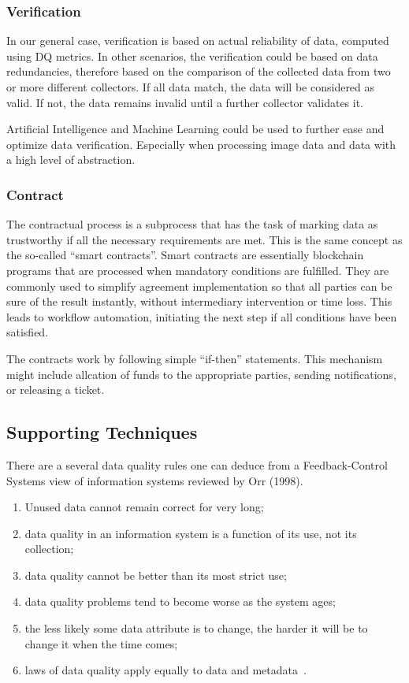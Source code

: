 \subsubsection{Verification}

In our general case, verification is based on actual reliability of data, computed using DQ metrics.
In other scenarios, the verification could be based on data redundancies, therefore based on the comparison of the collected data from two or more different collectors.
If all data match, the data will be considered as valid.
If not, the data remains invalid until a further collector validates it.

Artificial Intelligence and Machine Learning could be used to further ease and optimize data verification.
Especially when processing image data and data with a high level of abstraction.

\subsubsection{Contract}

The contractual process is a subprocess that has the task of marking data as trustworthy if all the necessary requirements are met.
This is the same concept as the so-called \enquote{smart contracts}.
Smart contracts are essentially blockchain programs that are processed when mandatory conditions are fulfilled.
They are commonly used to simplify agreement implementation so that all parties can be sure of the result instantly, without intermediary intervention or time loss.
This leads to workflow automation, initiating the next step if all conditions have been satisfied.

The contracts work by following simple \enquote{if-then} statements.
This mechanism might include allcation of funds to the appropriate parties, sending notifications, or releasing a ticket.

\subsection{Supporting Techniques}

There are a several data quality rules one can deduce from a Feedback-Control Systems view of information systems reviewed by Orr (1998).

\begin{enumerate}
    \item Unused data cannot remain correct for very long;
    \item data quality in an information system is a function of its use, not its collection;
    \item data quality cannot be better than its most strict use;
    \item data quality problems tend to become worse as the system ages;
    \item the less likely some data attribute is to change, the harder it will be to change it when the time comes;
    \item laws of data quality apply equally to data and metadata~\cite{orr1998}.
\end{enumerate}

